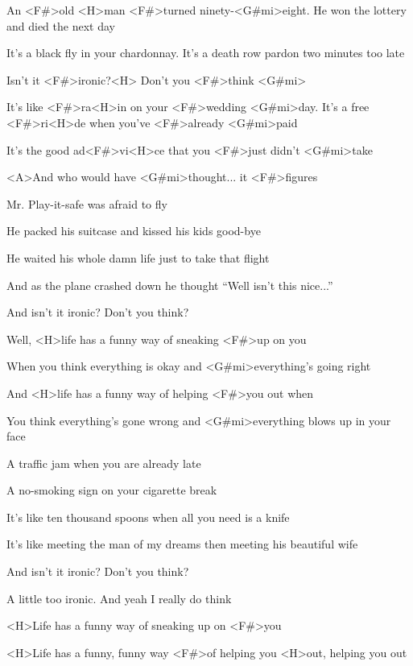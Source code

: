 

\zs
An <F#>old <H>man <F#>turned ninety-<G#mi>eight.
He won the lottery and died the next day

It's a black fly in your chardonnay.
It's a death row pardon two minutes too late

Isn't it <F#>ironic?<H> Don't you <F#>think <G#mi>
\ks

\zr
It's like <F#>ra<H>in on your <F#>wedding <G#mi>day.
It's a free <F#>ri<H>de when you've <F#>already <G#mi>paid

It's the good ad<F#>vi<H>ce that you <F#>just didn't <G#mi>take

<A>And who would have <G#mi>thought... it <F#>figures
\kr

\zs
Mr. Play-it-safe was afraid to fly

He packed his suitcase and kissed his kids good-bye

He waited his whole damn life just to take that flight

And as the plane crashed down he thought ``Well isn't this nice...''

And isn't it ironic? Don't you think?
\ks

\zr \kr

\zs
Well, <H>life has a funny way of sneaking <F#>up on you

When you think everything is okay and <G#mi>everything's going right

And <H>life has a funny way of helping <F#>you out when

You think everything's gone wrong and <G#mi>everything blows up in your face
\ks

\zs
A traffic jam when you are already late

A no-smoking sign on your cigarette break

It's like ten thousand spoons when all you need is a knife

It's like meeting the man of my dreams then meeting his beautiful wife

And isn't it ironic? Don't you think?

A little too ironic. And yeah I really do think
\ks

\zr \kr

\zs
<H>Life has a funny way of sneaking up on <F#>you

<H>Life has a funny, funny way <F#>of helping you <H>out, helping you out
\ks

\kp























